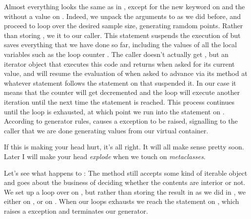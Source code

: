 Almost everything looks the same as in , except for the new
keyword  on  and the  without a
value on . Indeed, we unpack the arguments to 
as we did before, and proceed to loop over the desired sample size, generating ramdom points.
Rather than storing , we  it to our caller. This statement
suspends the execution of  but saves everything that we have done so far,
including the values of all the local variables such as the loop counter . The
caller doesn't actually get , but an iterator object that executes this code and
returns  when asked for its current value, and will resume the evaluation of
 when asked to advance via its  method at whatever statement
follows the  statement on  that suspended it. In
our case it means that the counter will get decremented and the loop will execute another
iteration until the next time the  statement is reached. This process continues
until the loop is exhausted, at which point we run into the  statement on
. According to generator rules,  causes a
 exception to be raised, signalling to the caller that we are done
generating values from our virtual container.

If this is making your head hurt, it's all right. It will all make sense pretty soon. Later I
will make your head {\em explode} when we touch on {\em metaclasses}.

Let's see what happens to :
%
%
%
%
%
%
%
%
The method  still accepts some kind of iterable object  and
goes about the business of deciding whether the contents are interior or not. We set up a loop
over  on , but rather than storing the
result in  as we did in , we either
  on , or  on
. When our loops exhausts  we reach the
 statement on , which raises a
 exception and terminates our generator.

